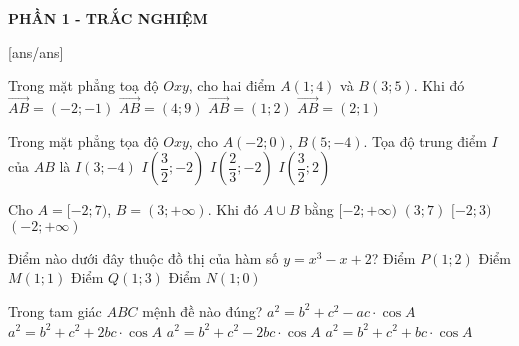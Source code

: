 
\begin{center}
	\textbf{PHẦN 1 - TRẮC NGHIỆM}
\end{center}
[ans/ans]
\begin{ex}%
	Trong mặt phẳng toạ độ $Oxy$, cho hai điểm $A(1;4)$ và $B(3;5)$. Khi đó
	\choice
	{$\overrightarrow{AB}=(-2;-1)$}
	{$\overrightarrow{AB}=(4;9)$}
	{$\overrightarrow{AB}=(1;2)$}
	{\True $\overrightarrow{AB}=(2;1)$}
\end{ex}
\begin{ex}%
	Trong mặt phẳng tọa độ $Oxy$, cho $A(-2;0)$, $B(5;-4)$. Tọa độ trung điểm $I$ của $AB$ là
	\choice
	{$I(3;-4)$}
	{\True $I\left(\dfrac{3}{2};-2\right)$}
	{$I\left(\dfrac{2}{3};-2\right)$}
	{$I\left(\dfrac{3}{2};2\right)$}
\end{ex}
\begin{ex}%
	Cho $A=[-2;7)$, $B=(3;+\infty)$. Khi đó $A \cup B$ bằng
	\choice
	{\True $[-2;+\infty)$}
	{$(3;7)$}
	{$[-2;3)$}
	{$(-2;+\infty)$}
	\loigiai{
	Ta có $A \cup B= [-2;7) \cup (3;+\infty) = \left[-2;+\infty\right)$.
}
\end{ex}
\begin{ex}%
	Điểm nào dưới đây thuộc đồ thị của hàm số $y=x^3-x+2$?
	\choice
	{\True Điểm $P(1;2)$}
	{Điểm $M(1;1)$}
	{Điểm $Q(1;3)$}
	{Điểm $N(1;0)$}
\end{ex}
\begin{ex}%
	Trong tam giác $ABC$ mệnh đề nào đúng?
	\choice
	{$a^2=b^2+c^2-ac \cdot \cos A$}
	{$a^2=b^2+c^2+2bc \cdot \cos A$}
	{\True $a^2=b^2+c^2-2bc \cdot \cos A$}
	{$a^2=b^2+c^2+bc \cdot \cos A$}
\end{ex}
